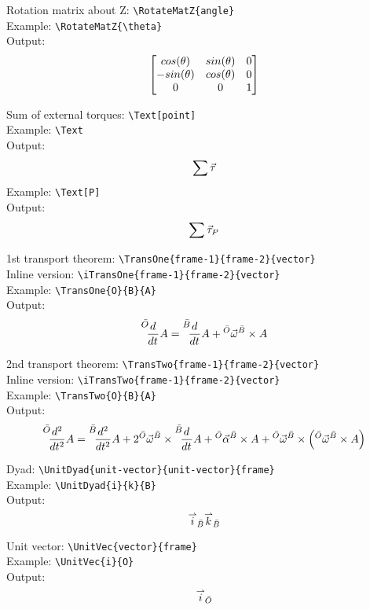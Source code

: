 \documentclass{article}
\begin{document}
\noindent
Rotation matrix about Z: \verb|\RotateMatZ{angle}|\\
Example: \verb|\RotateMatZ{\theta}|\\
Output:
\begin{equation*}
    \RotateMatZ{\theta}
\end{equation*} 

\noindent
Sum of external torques: \verb|\Text[point]|\\
Example: \verb|\Text|\\
Output:
\begin{equation*}
    \Text
\end{equation*} 
Example: \verb|\Text[P]|\\
Output:
\begin{equation*}
    \Text[P]
\end{equation*} 

\noindent
1st transport theorem: \verb|\TransOne{frame-1}{frame-2}{vector}|\\
Inline version: \verb|\iTransOne{frame-1}{frame-2}{vector}|\\
Example: \verb|\TransOne{O}{B}{A}|\\
Output:
\begin{equation*}
    \TransOne{O}{B}{A}
\end{equation*} 

\noindent
2nd transport theorem: \verb|\TransTwo{frame-1}{frame-2}{vector}|\\
Inline version: \verb|\iTransTwo{frame-1}{frame-2}{vector}|\\
Example: \verb|\TransTwo{O}{B}{A}|\\
Output:
\begin{equation*}
    \TransTwo{O}{B}{A}
\end{equation*} 


\noindent
Dyad: \verb|\UnitDyad{unit-vector}{unit-vector}{frame}|\\
Example: \verb|\UnitDyad{i}{k}{B}|\\
Output:
\begin{equation*}
    \UnitDyad{i}{k}{B}
\end{equation*} 

\noindent
Unit vector: \verb|\UnitVec{vector}{frame}|\\
Example: \verb|\UnitVec{i}{O}|\\
Output:
\begin{equation*}
    \UnitVec{i}{O}
\end{equation*} 
\end{document}
